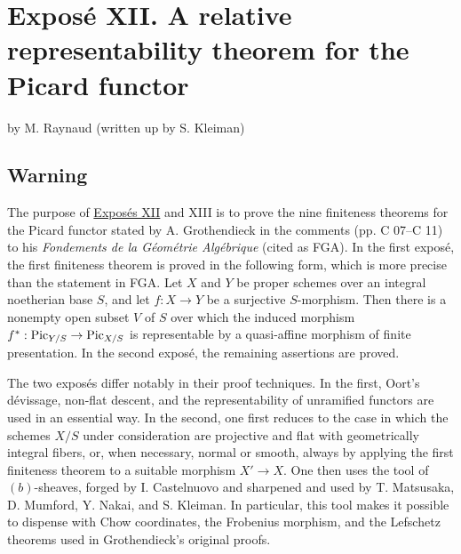 \providecommand{\Hom}{\operatorname{Hom}}
\providecommand{\Isom}{\operatorname{Isom}}
\providecommand{\Coker}{\operatorname{Coker}}
\providecommand{\Ass}{\operatorname{Ass}}
\providecommand{\sgacircled}[1]{\tikz[baseline=(char.base)]\node[shape=circle,draw,inner sep=.35pt](char){\mbox{\scriptsize #1}};}
\newpage
{}\section*{Expos\'e XII. A relative representability theorem for the Picard functor}
\begin{center}
by M. Raynaud (written up by S. Kleiman)
\end{center}

\subsection*{Warning}

The purpose of \hyperlink{sga6.e12.expose}{Expos\'es XII} and XIII is to prove the nine finiteness theorems
for the Picard functor stated by A. Grothendieck in the comments
(pp. C 07--C 11) to his \emph{Fondements de la G\'eom\'etrie Alg\'ebrique}
(cited as FGA). In the first expos\'e, the first finiteness theorem is proved
in the following form, which is more precise than the statement in FGA. Let
$X$ and $Y$ be proper schemes over an integral noetherian base $S$, and let
$f:X\to Y$ be a surjective $S$-morphism. Then there is a nonempty open subset
$V$ of $S$ over which the induced morphism
$f^*:\operatorname{Pic}_{Y/S}\to\operatorname{Pic}_{X/S}$ is representable by a quasi-affine morphism of
finite presentation. In the second expos\'e, the remaining assertions are
proved.

The two expos\'es differ notably in their proof techniques. In the first,
Oort's d\'evissage, non-flat descent, and the representability of unramified
functors are used in an essential way. In the second, one first reduces to
the case in which the schemes $X/S$ under consideration are projective and
flat with geometrically integral fibers, or, when necessary, normal or
smooth, always by applying the first finiteness theorem to a suitable
morphism $X'\to X$. One then uses the tool of $(b)$-sheaves, forged by
I. Castelnuovo and sharpened and used by T. Matsusaka, D. Mumford, Y. Nakai,
and S. Kleiman. In particular, this tool makes it possible to dispense with
Chow coordinates, the Frobenius morphism, and the Lefschetz theorems used in
Grothendieck's original proofs.

